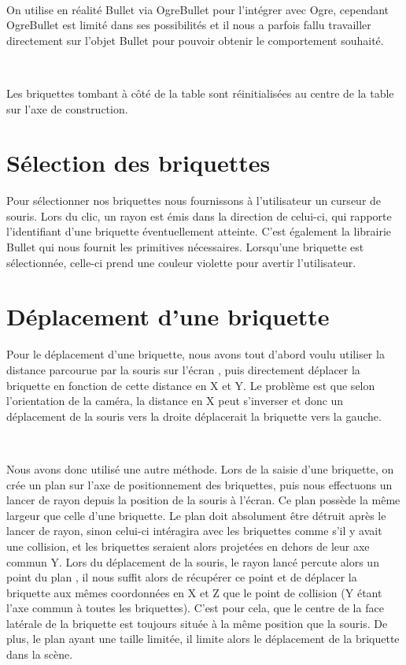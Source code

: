 \documentclass[frenchb,twoside]{EPURapport}
\begin{document}
		\
		
        On utilise en réalité Bullet via OgreBullet pour l'intégrer avec Ogre,
        cependant OgreBullet est limité dans ses possibilités et il nous a
        parfois fallu travailler directement sur l'objet Bullet pour pouvoir
        obtenir le comportement souhaité. 
        
        \
        
        Les briquettes tombant à côté de la table sont réinitialisées au centre
        de la table sur l'axe de construction.

    \section{Sélection des briquettes}
        Pour sélectionner nos briquettes nous fournissons à l'utilisateur un
        curseur de souris. Lors du clic, un rayon est émis dans la direction de
        celui-ci, qui rapporte l'identifiant d'une briquette éventuellement
        atteinte. C'est également la librairie Bullet qui nous fournit les
        primitives nécessaires. Lorsqu'une briquette est sélectionnée, celle-ci
        prend une couleur violette pour avertir l'utilisateur.
        
    \section{Déplacement d'une briquette}
        Pour le déplacement d'une briquette, nous avons tout d'abord voulu
         utiliser la distance parcourue par la souris sur l'écran
        , puis directement déplacer la briquette en fonction de cette distance en X et Y.
        Le problème est que selon l'orientation de la caméra, la distance en X
        peut s'inverser et donc un déplacement de la souris vers la droite
        déplacerait la briquette vers la gauche.
        
        \
        
        Nous avons donc utilisé une autre méthode.
        Lors de la saisie d'une briquette, on crée un plan sur l'axe de positionnement
        des briquettes, puis nous effectuons un lancer de rayon depuis la position de
        la souris à l'écran. Ce plan possède la même largeur que celle d'une briquette.
        Le plan doit absolument être détruit après le lancer de rayon, sinon celui-ci intéragira avec
        les briquettes comme s'il y avait une collision, et les briquettes seraient alors projetées en dehors
        de leur axe commun Y.
        Lors du déplacement de la souris, le rayon lancé percute alors un point du plan
        , il nous suffit alors de récupérer ce point et de déplacer la briquette aux mêmes
        coordonnées en X et Z que le point de collision (Y étant l'axe commun à toutes les briquettes).
        C'est pour cela, que le centre de la face latérale de la briquette est toujours
		située à la même position que la souris.
		De plus, le plan ayant une taille limitée, il limite alors le déplacement de la briquette dans la scène.
		
\end{document}
